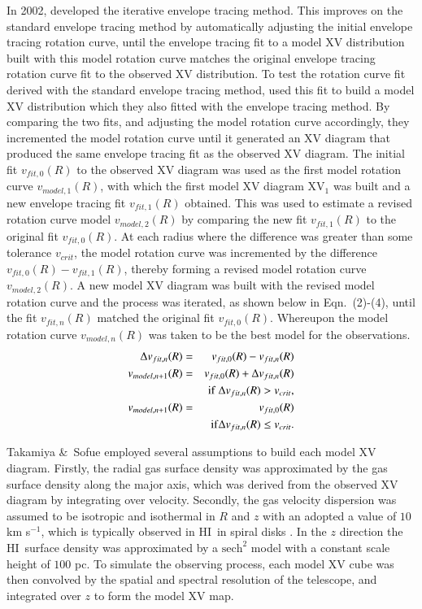 \documentclass[traditabstract]{aa} %
\newcommand\HI{H{\small I}}
\newcommand\kms{km s$^{-1}$}
\begin{document}
In 2002, \citet{ts2002} developed the iterative envelope tracing
method. This improves on the standard envelope tracing method by
automatically adjusting the initial envelope tracing rotation curve,
until the envelope tracing fit to a model XV distribution built with
this model rotation curve matches the original envelope tracing
rotation curve fit to the observed XV distribution. 
To test the rotation curve fit derived with the standard envelope tracing method, 
\citet{ts2002} used this fit to build a model XV distribution which they also 
fitted with the envelope tracing method. By comparing the two fits, and adjusting 
the model rotation curve accordingly, they incremented the model rotation curve 
until it generated an XV diagram that produced the same envelope tracing fit as 
the observed XV diagram. The initial fit $v_{fit,0}(R)$ to the observed XV 
diagram was used as the first model rotation curve $v_{model,1}(R)$, with 
which the first model XV diagram XV$_1$ was built and a new envelope tracing fit 
$v_{fit,1}(R)$ obtained. This was used to estimate a revised rotation curve
 model $v_{model,2}(R)$ by comparing the new fit $v_{fit,1}(R)$ to the original 
fit $v_{fit,0}(R)$. At each radius where the difference was greater than some 
tolerance $v_{crit}$, the model rotation curve was incremented by the difference 
$v_{fit,0}(R) -v_{fit,1}(R)$, thereby forming a revised model rotation curve 
$v_{model,2}(R)$. A new model XV diagram was built with the revised model rotation 
curve and the process was iterated, as shown below in Eqn.~(2)-(4), until the fit 
$v_{fit,n}(R)$ matched the original fit $v_{fit,0}(R)$. Whereupon the model 
rotation curve $v_{model,n}(R)$ was taken to be the best model for the observations.
\begin{eqnarray}
\label{eq:ch4-iter-env-trac.1}
\Delta v_{fit,n}(R) &=& v_{fit,0}(R) - v_{fit,n}(R) \\
\label{eq:ch4-iter-env-trac.2}
v_{model,n+1}(R) &=&  v_{fit,0}(R) + \Delta v_{fit,n}(R) \\
 & &  {\rm if }\  \Delta v_{fit,n}(R) >    v_{crit}, \nonumber \\ 
\label{eq:ch4-iter-env-trac.3}
v_{model,n+1}(R)  &=&  v_{fit,0}(R) \\
 & & {\rm if } \Delta v_{fit,n}(R) \leq  v_{crit}. \nonumber 
\end{eqnarray}

Takamiya \&\ Sofue employed several assumptions 
to build each model XV diagram. Firstly, the
radial gas surface density was approximated by the gas surface density along 
the major axis, which was derived from the observed XV diagram by integrating
over velocity. Secondly, the gas velocity dispersion was assumed to be
isotropic and isothermal in $R$ and $z$ with an adopted 
a value of $10$ \kms, which is typically observed in \HI\ in
spiral disks \citep{svdk1984, vdks1984}. In the
$z$ direction the \HI\ surface density was approximated by a 
$\textrm{sech}^2$ model 
with a constant scale height of $100$ pc. To simulate the observing 
process, each model 
XV cube was then convolved by the spatial and spectral resolution of the 
telescope, and 
integrated over $z$ to form the model XV map.
\end{document}
